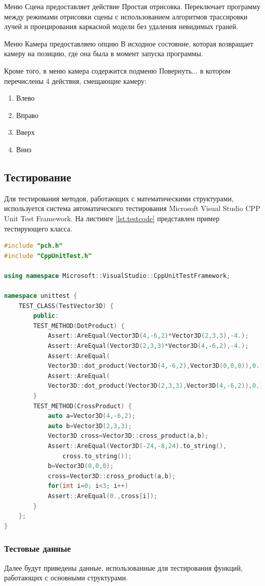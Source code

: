 Меню Сцена предоставляет действие Простая отрисовка. Переключает программу между режимами отрисовки сцены с использованием алгоритмов трассировки лучей и проецирования каркасной модели без удаления невидимых граней.

Меню Камера предоставляею опцию В исходное состояние, которая возвращает камеру на позицию, где она была в момент запуска программы.

Кроме того, в меню камера содержится подменю Повернуть... в котором перечислены 4 действия, смещающие камеру:
\begin{enumerate}
	\item Влево
	\item Вправо
	\item Вверх
	\item Вниз
\end{enumerate}

\subsection{Тестирование}
Для тестирования методов, работающих с математическими структурами, используется система автоматического тестирования Microsoft Visual Studio CPP Unit Test Framework. На листинге \ref{lst:testcode} представлен пример тестирующего класса.

\begin{lstlisting}[caption={Класс, реализующий тестирование методов для работы с трёхмерным вектором},label={lst:testcode},language=c++]
#include "pch.h"
#include "CppUnitTest.h"

using namespace Microsoft::VisualStudio::CppUnitTestFramework;

namespace unittest {	
	TEST_CLASS(TestVector3D) {
		public:
		TEST_METHOD(DotProduct) {
			Assert::AreEqual(Vector3D(4,-6,2)*Vector3D(2,3,3),-4.);
			Assert::AreEqual(Vector3D(2,3,3)*Vector3D(4,-6,2),-4.);
			Assert::AreEqual(
			Vector3D::dot_product(Vector3D(4,-6,2),Vector3D(0,0,0)),0.);
			Assert::AreEqual(
			Vector3D::dot_product(Vector3D(2,3,3),Vector3D(4,-6,2)),0.);
		}
		TEST_METHOD(CrossProduct) {
			auto a=Vector3D(4,-6,2);
			auto b=Vector3D(2,3,3);
			Vector3D cross=Vector3D::cross_product(a,b);
			Assert::AreEqual(Vector3D(-24,-8,24).to_string(),
				cross.to_string());	
			b=Vector3D(0,0,0);
			cross=Vector3D::cross_product(a,b);
			for(int i=0; i<3; i++)
			Assert::AreEqual(0.,cross[i]);
		}
	};
}
\end{lstlisting}
\subsubsection{Тестовые данные}
Далее будут приведены данные, использованные для тестирования функций, работающих с основными структурами.

